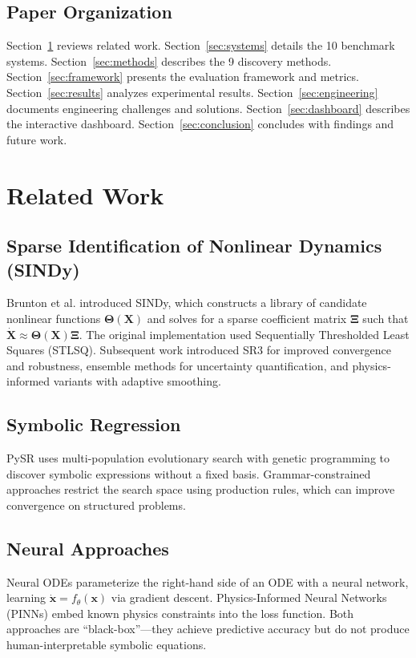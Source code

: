 \documentclass[conference]{IEEEtran}
\begin{document}
\subsection{Paper Organization}

Section~\ref{sec:related} reviews related work. Section~\ref{sec:systems} details the 10 benchmark systems. Section~\ref{sec:methods} describes the 9 discovery methods. Section~\ref{sec:framework} presents the evaluation framework and metrics. Section~\ref{sec:results} analyzes experimental results. Section~\ref{sec:engineering} documents engineering challenges and solutions. Section~\ref{sec:dashboard} describes the interactive dashboard. Section~\ref{sec:conclusion} concludes with findings and future work.

\section{Related Work}
\label{sec:related}

\subsection{Sparse Identification of Nonlinear Dynamics (SINDy)}
Brunton et al. \cite{brunton2016} introduced SINDy, which constructs a library of candidate nonlinear functions $\boldsymbol{\Theta}(\mathbf{X})$ and solves for a sparse coefficient matrix $\boldsymbol{\Xi}$ such that $\dot{\mathbf{X}} \approx \boldsymbol{\Theta}(\mathbf{X})\boldsymbol{\Xi}$. The original implementation used Sequentially Thresholded Least Squares (STLSQ). Subsequent work introduced SR3 \cite{zheng2019} for improved convergence and robustness, ensemble methods for uncertainty quantification, and physics-informed variants with adaptive smoothing.

\subsection{Symbolic Regression}
PySR \cite{cranmer2023} uses multi-population evolutionary search with genetic programming to discover symbolic expressions without a fixed basis. Grammar-constrained approaches restrict the search space using production rules, which can improve convergence on structured problems.

\subsection{Neural Approaches}
Neural ODEs \cite{chen2018} parameterize the right-hand side of an ODE with a neural network, learning $\dot{\mathbf{x}} = f_\theta(\mathbf{x})$ via gradient descent. Physics-Informed Neural Networks (PINNs) \cite{raissi2019} embed known physics constraints into the loss function. Both approaches are ``black-box''---they achieve predictive accuracy but do not produce human-interpretable symbolic equations.
\end{document}
